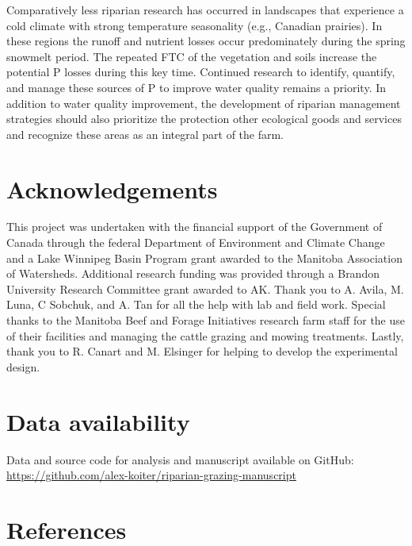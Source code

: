 \documentclass[
]{agujournal2019}
\begin{document}
Comparatively less riparian research has occurred in landscapes that
experience a cold climate with strong temperature seasonality (e.g.,
Canadian prairies). In these regions the runoff and nutrient losses
occur predominately during the spring snowmelt period. The repeated FTC
of the vegetation and soils increase the potential P losses during this
key time. Continued research to identify, quantify, and manage these
sources of P to improve water quality remains a priority. In addition to
water quality improvement, the development of riparian management
strategies should also prioritize the protection other ecological goods
and services and recognize these areas as an integral part of the farm.

\section*{Acknowledgements}\label{acknowledgements}

This project was undertaken with the financial support of the Government
of Canada through the federal Department of Environment and Climate
Change and a Lake Winnipeg Basin Program grant awarded to the Manitoba
Association of Watersheds. Additional research funding was provided
through a Brandon University Research Committee grant awarded to AK.
Thank you to A. Avila, M. Luna, C Sobchuk, and A. Tan for all the help
with lab and field work. Special thanks to the Manitoba Beef and Forage
Initiatives research farm staff for the use of their facilities and
managing the cattle grazing and mowing treatments. Lastly, thank you to
R. Canart and M. Elsinger for helping to develop the experimental
design.

\section*{Data availability}\label{data-availability}

Data and source code for analysis and manuscript available on GitHub:
\url{https://github.com/alex-koiter/riparian-grazing-manuscript}

\section*{References}\label{references}
\end{document}
